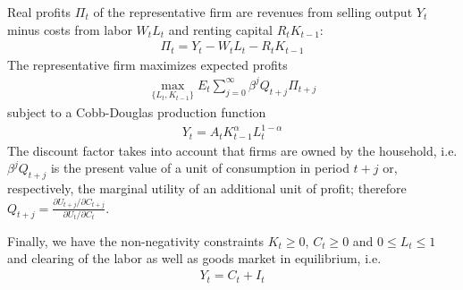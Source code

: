 \documentclass[a4paper]{scrartcl}
\begin{document}
Real profits $\Pi_t$ of the representative firm are revenues from selling output $Y_t$ minus costs from labor $W_t L_t$ and renting capital $R_t K_{t-1}$:
\begin{align*}
\Pi_t = Y_{t} - W_{t} L_{t} - R_{t} K_{t-1}
\end{align*}	
The representative firm maximizes expected profits
\begin{align*}
\underset{\{L_{t},K_{t-1}\}}{\max} E_t \sum_{j=0}^{\infty} \beta^j Q_{t+j}\Pi_{t+j}
\end{align*}
subject to a Cobb-Douglas production function
\begin{align*}
Y_t = A_t K_{t-1}^\alpha L_t^{1-\alpha}
\end{align*}
The discount factor takes into account that firms are owned by the household, i.e. $\beta^j Q_{t+j}$ is the present value of a unit of consumption in period $t+j$ or, respectively, the marginal utility of an additional unit of profit; therefore $Q_{t+j}=\frac{\partial U_{t+j}/\partial C_{t+j}}{\partial U_{t}/\partial C_{t}}$.

Finally, we have the non-negativity constraints	$K_t \geq0$, $C_t \geq 0$ and $0\leq L_t \leq 1$ and clearing of the labor as well as goods market in equilibrium, i.e.
\begin{align*}
Y_t = C_t + I_t
\end{align*}
\end{document}
